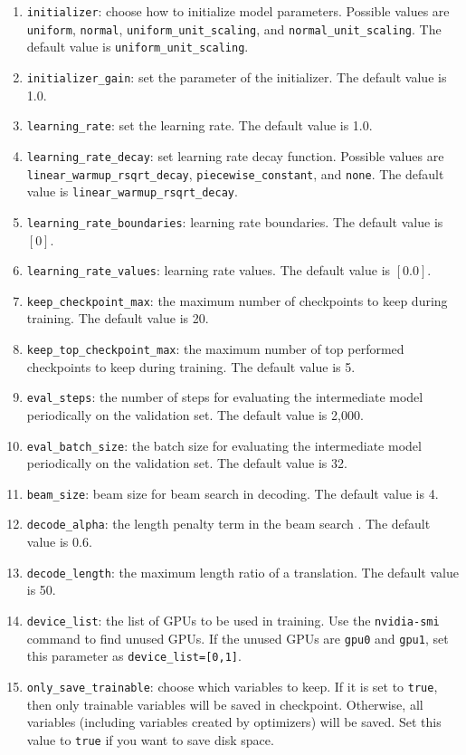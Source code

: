 \documentclass{article}
\begin{document}
\begin{enumerate}
\item \verb|initializer|: choose how to initialize model parameters. Possible values are \verb|uniform|, \verb|normal|, \verb|uniform_unit_scaling|, and \verb|normal_unit_scaling|. The default value is \verb|uniform_unit_scaling|.
\item \verb|initializer_gain|: set the parameter of the initializer. The default value is 1.0.
\item \verb|learning_rate|: set the learning rate. The default value is 1.0.
\item \verb|learning_rate_decay|: set learning rate decay function. Possible values are \verb|linear_warmup_rsqrt_decay|, \verb|piecewise_constant|, and \verb|none|. The default value is \verb|linear_warmup_rsqrt_decay|.
\item \verb|learning_rate_boundaries|: learning rate boundaries. The default value is $[0]$.
\item \verb|learning_rate_values|: learning rate values. The default value is $[0.0]$.
\item \verb|keep_checkpoint_max|: the maximum number of checkpoints to keep during training. The default value is 20.
\item \verb|keep_top_checkpoint_max|: the maximum number of top performed checkpoints to keep during training. The default value is 5.
\item \verb|eval_steps|: the number of steps for evaluating the intermediate model periodically on the validation set. The default value is 2,000.
\item \verb|eval_batch_size|: the batch size for evaluating the intermediate model periodically on the validation set. The default value is 32.
\item \verb|beam_size|: beam size for beam search in decoding. The default value is 4.
\item \verb|decode_alpha|: the length penalty term in the beam search \citep{Wu:16}. The default value is 0.6.
\item \verb|decode_length|: the maximum length ratio of a translation. The default value is 50.
\item \verb|device_list|: the list of GPUs to be used in training. Use the \verb|nvidia-smi| command to find unused GPUs. If the unused GPUs are \verb|gpu0| and \verb|gpu1|, set this parameter as \verb|device_list=[0,1]|.
\item \verb|only_save_trainable|: choose which variables to keep. If it is set to \verb|true|, then only trainable variables will be saved in checkpoint. Otherwise, all variables (including variables created by optimizers) will be saved. Set this value to \verb|true| if you want to save disk space.
\end{enumerate}
\end{document}
